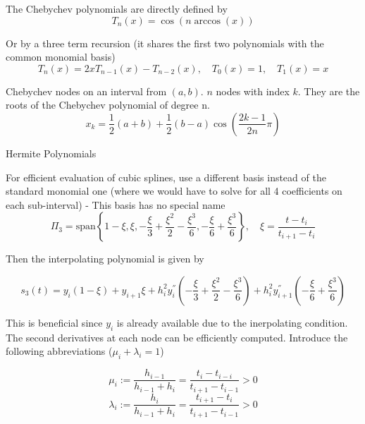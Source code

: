 \documentclass[
    a4paper,
    11pt
]{article}
\begin{document}
\hrulefill

The Chebychev polynomials are directly defined by
\begin{equation}
    T_n(x) = \cos(n\arccos(x))
\end{equation}

Or by a three term recursion (it shares the first two polynomials with the
common monomial basis)
\begin{equation}
    T_n(x) = 2xT_{n-1}(x) - T_{n-2}(x), \quad T_0(x) = 1, \quad T_1(x) = x
\end{equation}

Chebychev nodes on an interval from $(a,b)$. $n$ nodes with index $k$. They are
the roots of the Chebychev polynomial of degree n.
\begin{equation}
    x_k = \frac{1}{2}(a+b) + \frac{1}{2}(b-a)\cos(\frac{2k-1}{2n}\pi)
\end{equation}

\hrulefill

Hermite Polynomials

\hrulefill

For efficient evaluation of cubic splines, use a different basis instead of the
standard monomial one (where we would have to solve for all 4 coefficients on
each sub-interval) - This basis has no special name
\begin{equation}
    \Pi_3 = \text{span}\left\{
        1 - \xi,
        \xi,
        -\frac{\xi}{3}+\frac{\xi^2}{2}-\frac{\xi^3}{6},
        -\frac{\xi}{6} + \frac{\xi^3}{6}
    \right\}, \quad \xi = \frac{t-t_i}{t_{i+1} - t_i}
\end{equation}

Then the interpolating polynomial is given by

\begin{equation}
    s_3(t) = y_i(1-\xi) + y_{i+1}\xi + h_i^2 y_i^{''} \left( -\frac{\xi}{3} +
    \frac{\xi^2}{2} - \frac{\xi^3}{6} \right) + h_i^2 y_{i+1}^{''} \left(
    -\frac{\xi}{6} + \frac{\xi^3}{6} \right)
\end{equation}

This is beneficial since $y_i$ is already available due to the inerpolating
condition. The second derivatives at each node can be efficiently computed.
Introduce the following abbreviations ($\mu_i + \lambda_i =1$)

\begin{equation}
    \mu_i := \frac{h_{i-1}}{h_{i-1} + h_i} = \frac{t_i -t_{i-i}}{t_{i+1} -
    t_{i-1}} > 0
\end{equation}
\begin{equation}
    \lambda_i := \frac{h_i}{h_{i-1} + h_i} = \frac{t_{i+1} - t_i}{t_{i+1} -
    t_{i-1}} > 0
\end{equation}
\end{document}
